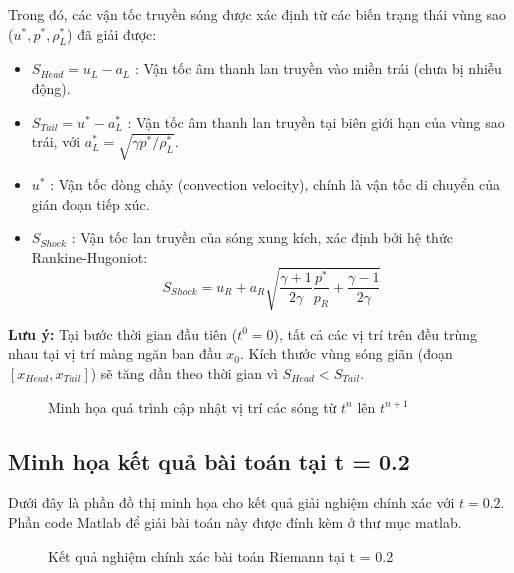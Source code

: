 Trong đó, các vận tốc truyền sóng được xác định từ các biến trạng thái vùng sao ($u^*, p^*, \rho_L^*$) đã giải được:
\begin{itemize}
    \item $S_{Head} = u_L - a_L$ : Vận tốc âm thanh lan truyền vào miền trái (chưa bị nhiễu động).
    \item $S_{Tail} = u^* - a_L^*$ : Vận tốc âm thanh lan truyền tại biên giới hạn của vùng sao trái, với $a_L^* = \sqrt{\gamma p^* / \rho_L^*}$.
    \item $u^*$ : Vận tốc dòng chảy (convection velocity), chính là vận tốc di chuyển của gián đoạn tiếp xúc.
    \item $S_{Shock}$ : Vận tốc lan truyền của sóng xung kích, xác định bởi hệ thức Rankine-Hugoniot:
    \begin{equation*}
        S_{Shock} = u_R + a_R \sqrt{\frac{\gamma+1}{2\gamma}\frac{p^*}{p_R} + \frac{\gamma-1}{2\gamma}}
    \end{equation*}
\end{itemize}

\textbf{Lưu ý:} Tại bước thời gian đầu tiên ($t^0 = 0$), tất cả các vị trí trên đều trùng nhau tại vị trí màng ngăn ban đầu $x_0$. Kích thước vùng sóng giãn (đoạn $[x_{Head}, x_{Tail}]$) sẽ tăng dần theo thời gian vì $S_{Head} < S_{Tail}$.

\begin{figure}[H]
\centering

\caption{Minh họa quá trình cập nhật vị trí các sóng từ $t^n$ lên $t^{n+1}$}
\label{fig:wave_update}
\end{figure}

\subsection{Minh họa kết quả bài toán tại t = 0.2}

Dưới đây là phần đồ thị minh họa cho kết quả giải nghiệm chính xác với $t = 0.2$. Phần code Matlab để giải bài toán này được đính kèm ở thư mục matlab.

\begin{figure}[H]
\centering

\caption{Kết quả nghiệm chính xác bài toán Riemann tại t = 0.2}
\label{fig:riemann_results}
\end{figure}
